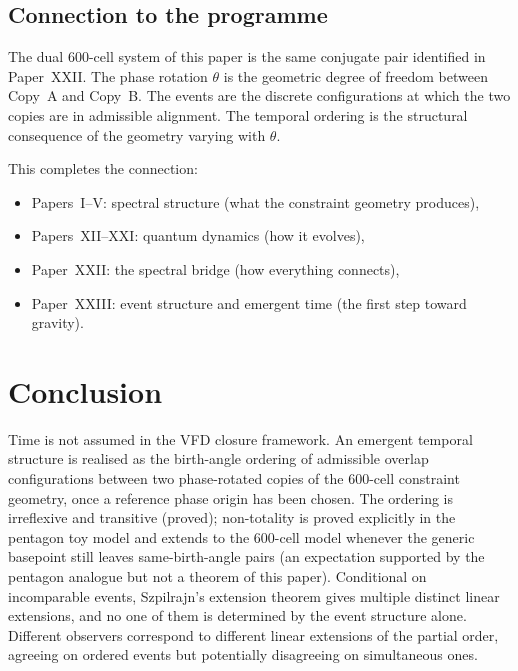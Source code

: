 \documentclass[12pt]{article}
\begin{document}
\subsection{Connection to the programme}

The dual 600-cell system of this paper is the same conjugate pair identified in Paper~XXII. The phase rotation $\theta$ is the geometric degree of freedom between Copy~A and Copy~B. The events are the discrete configurations at which the two copies are in admissible alignment. The temporal ordering is the structural consequence of the geometry varying with $\theta$.

This completes the connection:
\begin{itemize}
    \item Papers~I--V: spectral structure (what the constraint geometry produces),
    \item Papers~XII--XXI: quantum dynamics (how it evolves),
    \item Paper~XXII: the spectral bridge (how everything connects),
    \item Paper~XXIII: event structure and emergent time (the first step toward gravity).
\end{itemize}

\section{Conclusion}\label{sec:conclusion}

Time is not assumed in the VFD closure framework. An emergent temporal structure is realised as the birth-angle ordering of admissible overlap configurations between two phase-rotated copies of the 600-cell constraint geometry, once a reference phase origin has been chosen. The ordering is irreflexive and transitive (proved); non-totality is proved explicitly in the pentagon toy model and extends to the 600-cell model whenever the generic basepoint still leaves same-birth-angle pairs (an expectation supported by the pentagon analogue but not a theorem of this paper). Conditional on incomparable events, Szpilrajn's extension theorem gives multiple distinct linear extensions, and no one of them is determined by the event structure alone. Different observers correspond to different linear extensions of the partial order, agreeing on ordered events but potentially disagreeing on simultaneous ones.
\end{document}
